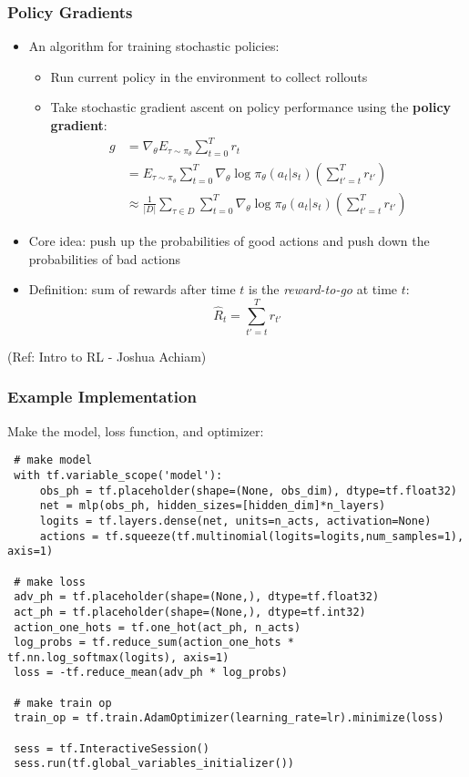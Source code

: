 \begin{frame}[fragile]\frametitle{Policy Gradients}

\begin{itemize}
\item An algorithm for training stochastic policies:
\begin{itemize}
\item Run current policy in the environment to collect rollouts
\item Take stochastic gradient ascent on policy performance using the \textbf{policy gradient}:
\begin{align*}
g &= \nabla_{\theta} E_{\tau \sim \pi_{\theta}}{\sum_{t=0}^T r_t} \\
&= E_{\tau \sim \pi_{\theta}}{\sum_{t=0}^T \nabla_{\theta} \log \pi_{\theta}(a_t | s_t) \left(\sum_{t'=t}^T r_{t'}\right)}\\
&\approx \frac{1}{|D|}\sum_{\tau \in D} \sum_{t=0}^T \nabla_{\theta} \log \pi_{\theta}(a_t | s_t) \left(\sum_{t'=t}^T r_{t'}\right)
\end{align*}
\end{itemize}
\item Core idea: push up the probabilities of good actions and push down the probabilities of bad actions
\item Definition: sum of rewards after time $t$ is the \textit{reward-to-go} at time $t$:
%
\begin{equation*}
\hat{R}_t = \sum_{t'=t}^T r_{t'}
\end{equation*}
\end{itemize}

{\tiny (Ref: Intro to RL - Joshua Achiam)}


\end{frame}

\begin{frame}[fragile]\frametitle{Example Implementation}

Make the model, loss function, and optimizer:
\begin{lstlisting}
 # make model
 with tf.variable_scope('model'):
     obs_ph = tf.placeholder(shape=(None, obs_dim), dtype=tf.float32)
     net = mlp(obs_ph, hidden_sizes=[hidden_dim]*n_layers)
     logits = tf.layers.dense(net, units=n_acts, activation=None)
     actions = tf.squeeze(tf.multinomial(logits=logits,num_samples=1), axis=1)

 # make loss
 adv_ph = tf.placeholder(shape=(None,), dtype=tf.float32)
 act_ph = tf.placeholder(shape=(None,), dtype=tf.int32)
 action_one_hots = tf.one_hot(act_ph, n_acts)
 log_probs = tf.reduce_sum(action_one_hots * tf.nn.log_softmax(logits), axis=1)
 loss = -tf.reduce_mean(adv_ph * log_probs)

 # make train op
 train_op = tf.train.AdamOptimizer(learning_rate=lr).minimize(loss)

 sess = tf.InteractiveSession()
 sess.run(tf.global_variables_initializer())
\end{lstlisting}


\end{frame}

